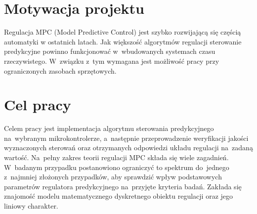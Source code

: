 \section{Motywacja projektu}
Regulacja MPC (Model Predictive Control) jest szybko rozwijającą się częścią automatyki
w ostatnich latach. Jak większość algorytmów regulacji sterowanie predykcyjne powinno
funkcjonować w~wbudowanych systemach czasu rzeczywistego. W~związku z~tym wymagana jest
możliwość pracy przy ograniczonych zasobach sprzętowych.  

\section{Cel pracy}
Celem pracy jest implementacja algorytmu sterowania predykcyjnego na~wybranym
mikrokontrolerze, a~następnie przeprowadzenie weryfikacji jakości wyznaczonych sterowań
oraz otrzymanych odpowiedzi układu regulacji na~zadaną wartość. Na~pełny zakres teorii
regulacji MPC składa się wiele zagadnień. W~badanym przypadku postanowiono ograniczyć
to spektrum do~jednego z~najmniej złożonych przypadków, aby sprawdzić wpływ podstawowych
parametrów regulatora predykcyjnego na~przyjęte kryteria badań. Zakłada się znajomość
modelu matematycznego dyskretnego obiektu regulacji oraz jego liniowy charakter.
